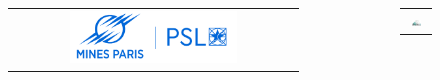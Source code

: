 \documentclass[9pt]{beamer}
\begin{document}

\section*{}

\begin{frame}{}

    \begin{columns}

        \begin{column}{0.6\textwidth}
            \begin{figure}
                \begin{tabular}{c}
                    \includegraphics[width=0.6\textwidth]{TEMPLATE_IMAGES/MINES.png} \\
                \end{tabular}
            \end{figure}
        \end{column}

        \begin{column}{0.4\textwidth}
            \begin{figure}
                \begin{tabular}{c}
                    \includegraphics[width=0.5\textwidth]{TEMPLATE_IMAGES/MESSIAH.pdf} \\
                \end{tabular}
            \end{figure}
        \end{column}

    \end{columns}

    \vspace{0.5cm}


\end{frame}
\end{document}
